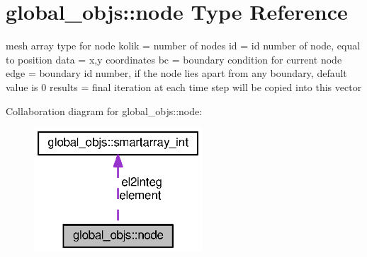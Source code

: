 \section{global\+\_\+objs\+:\+:node Type Reference}
\label{structglobal__objs_1_1node}


mesh array type for node kolik = number of nodes id = id number of node, equal to position data = x,y coordinates bc = boundary condition for current node edge = boundary id number, if the node lies apart from any boundary, default value is 0 results = final iteration at each time step will be copied into this vector  




Collaboration diagram for global\+\_\+objs\+:\+:node\+:\nopagebreak
\begin{figure}[H]
\begin{center}
\leavevmode
\includegraphics[width=178pt]{structglobal__objs_1_1node__coll__graph}
\end{center}
\end{figure}

